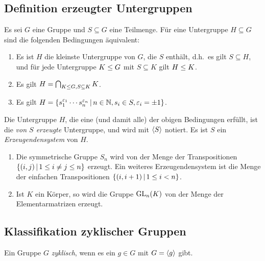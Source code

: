 \subsection{Definition erzeugter Untergruppen}

Es sei $G$ eine Gruppe und $S \subseteq G$ eine Teilmenge.
Für eine Untergruppe $H \subseteq G$ sind die folgenden Bedingungen äquivalent:

\begin{enumerate}
  \item
    Es ist $H$ die kleinste Untergruppe von $G$, die $S$ enthält, d.h.\ es gilt $S \subseteq H$, und für jede Untergruppe $K \mathrel{\leq} G$ mit $S \subseteq K$ gilt $H \mathrel{\leq} K$.
  \item
    Es gilt $H = \bigcap_{K \mathrel{\leq} G, S \subseteq K} K$.
  \item
    Es gilt
    $
        H
      = \{
          s_1^{\varepsilon_1} \dotsm s_n^{\varepsilon_n}
        \suchthat
          n \in \Natural,
          s_i \in S,
          \varepsilon_i = \pm 1
        \}
    $.
\end{enumerate}

\begin{definition}
  Die Untergruppe $H$, die eine \textup(und damit alle\textup) der obigen Bedingungen erfüllt, ist die \emph{von $S$ erzeugte} Untergruppe, und wird mit $\langle S\rangle$ notiert.
  Es ist $S$ ein \emph{Erzeugendensystem} von $H$.
\end{definition}

\begin{example}
  \begin{enumerate}
    \item
      Die symmetrische Gruppe $S_n$ wird von der Menge der Transpositionen $\{ (i, j) \suchthat 1 \leq i \neq j \leq n \}$ erzeugt.
      Ein weiteres Erzeugendensystem ist die Menge der einfachen Transpositionen $\{ (i, i+1) \suchthat 1 \leq i < n \}$.
    \item
      Ist $K$ ein Körper, so wird die Gruppe $\operatorname{GL}_{n}(K)$ von der Menge der Elementarmatrizen erzeugt.
  \end{enumerate}
\end{example}



\subsection{Klassifikation zyklischer Gruppen}

\begin{definition}
  Ein Gruppe $G$ \emph{zyklisch}, wenn es ein $g \in G$ mit $G = \langle g\rangle$ gibt.
\end{definition}

